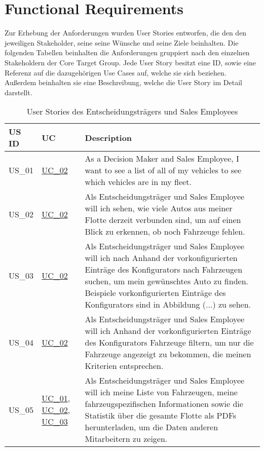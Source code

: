 \chapter{Functional Requirements}
Zur Erhebung der Anforderungen wurden User Stories entworfen, die den den jeweiligen Stakeholder, seine seine Wünsche und seine Ziele beinhalten. Die folgenden Tabellen beinhalten die Anforderungen gruppiert nach den einzelnen Stakeholdern der Core Target Group. Jede User Story besitzt eine ID, sowie eine Referenz auf die dazugehörigen Use Cases auf, welche sie sich beziehen. Außerdem beinhalten sie eine Beschreibung, welche die User Story im Detail darstellt.

  \sffamily
  \begin{footnotesize}
    \begin{longtable}[L L L]{ p{} p{} p{} }
      \caption                       %
          {User Stories des Entscheidungsträgers und Sales Employees} %
          \\
      \toprule
      \textbf{US ID} & \textbf{UC} & \textbf{Description} \\
      \midrule
      \hypertarget{Ref:US1}{US\_01} & \hyperlink{Ref:UC2}{UC\_02} & As a Decision Maker and Sales Employee, I want to see a list of all of my vehicles to see which vehicles are in my fleet. \\ 
      \hypertarget{Ref:US2}{US\_02} & \hyperlink{Ref:UC2}{UC\_02} & Als Entscheidungsträger und Sales Employee will ich sehen, wie viele Autos aus meiner Flotte derzeit verbunden sind, um auf einen Blick zu erkennen, ob noch Fahrzeuge fehlen. \\
      \hypertarget{Ref:US3}{US\_03} & \hyperlink{Ref:UC2}{UC\_02} & Als Entscheidungsträger und Sales Employee will ich nach Anhand der vorkonfigurierten Einträge des Konfigurators nach Fahrzeugen suchen, um mein gewünschtes Auto zu finden. 
      Beispiele vorkonfigurierten Einträge des Konfigurators sind in Abbildung (...) zu sehen.
      \\
      \hypertarget{Ref:US4}{US\_04} & \hyperlink{Ref:UC2}{UC\_02} & Als Entscheidungsträger und Sales Employee will ich Anhand der vorkonfigurierten Einträge des Konfigurators Fahrzeuge filtern, um nur die Fahrzeuge angezeigt zu bekommen, die meinen Kriterien entsprechen. \\
      \hypertarget{Ref:US5}{US\_05} & \hyperlink{Ref:UC1}{UC\_01}, \newline \hyperlink{Ref:UC2}{UC\_02}, \newline \hyperlink{Ref:UC3}{UC\_03} & Als Entscheidungsträger und Sales Employee will ich meine Liste von Fahrzeugen, meine fahrzeugspezifischen Informationen sowie die Statistik über die gesamte Flotte als PDFs herunterladen, um die Daten anderen Mitarbeitern zu zeigen. \\

\end{longtable}
\end{footnotesize}
